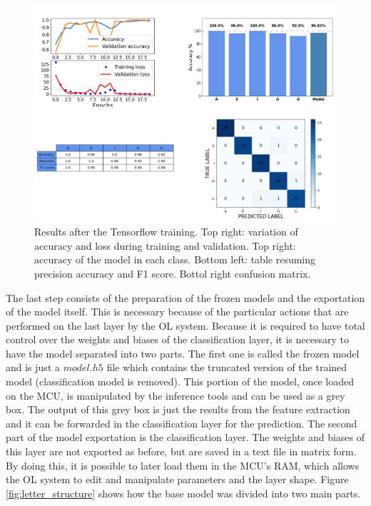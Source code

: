 \documentclass[12pt]{report}
\begin{document}
\begin{figure}[h!]
    \centering
    \includegraphics[width=130mm]{Figures/Chapter4/training_letters.png} 
    \caption{Results after the Tensorflow training. Top right: variation of accuracy and loss during training and validation. Top right: accuracy of the model in each class. Bottom left: table resuming precision accuracy and F1 score. Bottol right confusion matrix.}
    \label{fig:training_letters}    
\end{figure}

The last step consists of the preparation of the frozen models and the exportation of the model itself. This is necessary because of the particular actions that are performed on the last layer by the OL system. Because it is required to have total control over the weights and biases of the classification layer, it is necessary to have the model separated into two parts. The first one is called the frozen model and is just a $model.h5$ file which contains the truncated version of the trained model (classification model is removed). This portion of the model, once loaded on the MCU, is manipulated by the inference tools and can be used as a grey box. The output of this grey box is just the results from the feature extraction and it can be forwarded in the classification layer for the prediction.
The second part of the model exportation is the classification layer. The weights and biases of this layer are not exported as before, but are saved in a text file in matrix form. By doing this, it is possible to later load them in the MCU's RAM, which allows the OL system to edit and manipulate parameters and the layer shape. 
Figure \ref{fig:letter_structure} shows how the base model was divided into two main parts.
\end{document}
